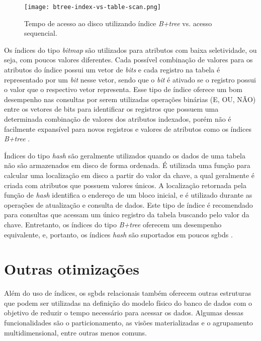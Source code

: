 \begin{figure}[ht]
  \centering
  \caption{Tempo de acesso ao disco utilizando índice \emph{B+tree} vs. acesso sequencial.}
  \texttt{[image: btree-index-vs-table-scan.png]}
  \label{fig:btree-index-vs-table-scan}
\end{figure}

Os índices do tipo \emph{bitmap} são utilizados para atributos com baixa seletividade, ou seja, com poucos valores diferentes. Cada possível combinação de valores para os atributos do índice possui um vetor de \emph{bits} e cada registro na tabela é representado por um \emph{bit} nesse vetor, sendo que o \emph{bit} é ativado se o registro possui o valor que o respectivo vetor representa. Esse tipo de índice oferece um bom desempenho nas consultas por serem utilizadas operações binárias (E, OU, NÃO) entre os vetores de bits para identificar os registros que possuem uma determinada combinação de valores dos atributos indexados, porém não é facilmente expansível para novos registros e valores de atributos como os índices \emph{B+tree} \cite[p. 27]{Lightstone:2007}.

Índices do tipo \emph{hash} são geralmente utilizados quando os dados de uma tabela não são armazenados em disco de forma ordenada. É utilizada uma função para calcular uma localização em disco a partir do valor da chave, a qual geralmente é criada com atributos que possuem valores únicos. A localização retornada pela função de \emph{hash} identifica o endereço de um bloco inicial, e é utilizado durante as operações de atualização e consulta de dados. Este tipo de índice é recomendado para consultas que acessam um único registro da tabela buscando pelo valor da chave. Entretanto, os índices do tipo \emph{B+tree} oferecem um desempenho equivalente, e, portanto, os índices \emph{hash} são suportados em poucos \glspl{sgbd} \cite[p. 56]{Lightstone:2007}.





\section{Outras otimizações}
\label{outras-otimizacoes}

Além do uso de índices, os \glspl{sgbd} relacionais também oferecem outras estruturas que podem ser utilizadas na definição do modelo físico do banco de dados com o objetivo de reduzir o tempo necessário para acessar os dados. Algumas dessas funcionalidades são o particionamento, as visões materializadas e o agrupamento multidimensional, entre outras menos comuns.

